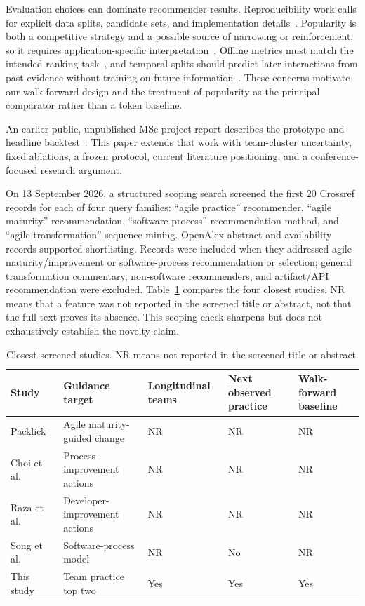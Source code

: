 \documentclass[runningheads]{llncs}
\begin{document}
Evaluation choices can dominate recommender results. Reproducibility work calls for explicit data splits, candidate sets, and implementation details~\cite{bellogin2021accountability}. Popularity is both a competitive strategy and a possible source of narrowing or reinforcement, so it requires application-specific interpretation~\cite{klimashevskaia2024popularity}. Offline metrics must match the intended ranking task~\cite{herlocker2004evaluation}, and temporal splits should predict later interactions from past evidence without training on future information~\cite{bellogin2021accountability}. These concerns motivate our walk-forward design and the treatment of popularity as the principal comparator rather than a token baseline.

An earlier public, unpublished MSc project report describes the prototype and headline backtest~\cite{morabia2026project}. This paper extends that work with team-cluster uncertainty, fixed ablations, a frozen protocol, current literature positioning, and a conference-focused research argument.

On 13 September 2026, a structured scoping search screened the first 20 Crossref records for each of four query families: ``agile practice'' recommender, ``agile maturity'' recommendation, ``software process'' recommendation method, and ``agile transformation'' sequence mining. OpenAlex abstract and availability records supported shortlisting. Records were included when they addressed agile maturity/improvement or software-process recommendation or selection; general transformation commentary, non-software recommenders, and artifact/API recommendation were excluded. Table~\ref{tab:gap} compares the four closest studies. NR means that a feature was not reported in the screened title or abstract, not that the full text proves its absence. This scoping check sharpens but does not exhaustively establish the novelty claim.

\begin{table}[t]
\caption{Closest screened studies. NR means not reported in the screened title or abstract.}
\label{tab:gap}
\centering
\scriptsize
\setlength{\tabcolsep}{2.5pt}
\begin{tabular}{@{}p{1.45cm}p{2.75cm}p{1.65cm}p{1.65cm}p{1.55cm}@{}}
\hline
\textbf{Study} & \textbf{Guidance target} & \textbf{Longitudinal teams} & \textbf{Next observed practice} & \textbf{Walk-forward baseline} \\
\hline
Packlick~\cite{packlick2007maturity} & Agile maturity-guided change & NR & NR & NR \\
Choi et al.~\cite{choi2012remo} & Process-improvement actions & NR & NR & NR \\
Raza et al.~\cite{raza2017webprocesspair} & Developer-improvement actions & NR & NR & NR \\
Song et al.~\cite{song2016process} & Software-process model & NR & No & NR \\
This study & Team practice top two & Yes & Yes & Yes \\
\hline
\end{tabular}
\end{table}
\end{document}
